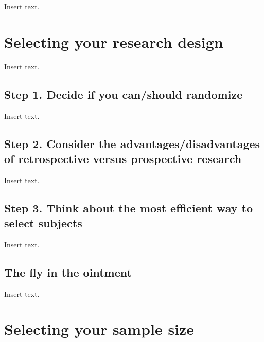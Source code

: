 \documentclass[
  letterpaper,
  DIV=11,
  numbers=noendperiod]{scrreprt}
\begin{document}
Insert text.


\hypertarget{selecting-your-research-design}{%
\chapter{Selecting your research
design}\label{selecting-your-research-design}}

Insert text.

\hypertarget{step-1.-decide-if-you-canshould-randomize}{%
\section{Step 1. Decide if you can/should
randomize}\label{step-1.-decide-if-you-canshould-randomize}}

Insert text.

\hypertarget{step-2.-consider-the-advantagesdisadvantages-of-retrospective-versus-prospective-research}{%
\section{Step 2. Consider the advantages/disadvantages of retrospective
versus prospective
research}\label{step-2.-consider-the-advantagesdisadvantages-of-retrospective-versus-prospective-research}}

Insert text.

\hypertarget{step-3.-think-about-the-most-efficient-way-to-select-subjects}{%
\section{Step 3. Think about the most efficient way to select
subjects}\label{step-3.-think-about-the-most-efficient-way-to-select-subjects}}

Insert text.

\hypertarget{the-fly-in-the-ointment-2}{%
\section{The fly in the ointment}\label{the-fly-in-the-ointment-2}}

Insert text.


\hypertarget{selecting-your-sample-size}{%
\chapter{Selecting your sample size}\label{selecting-your-sample-size}}
\end{document}
